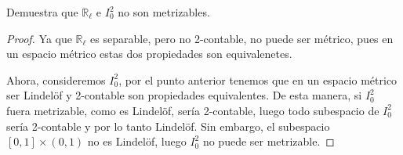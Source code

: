 
 \item Demuestra que $\mathbb{R}_{\ell}$ e $I^2_0$ no son metrizables.

\begin{proof}
    Ya que $\mathbb{R}_{\ell}$ es separable, pero no 2-contable, no puede ser métrico, pues en un espacio métrico estas dos propiedades son equivalenetes.

    Ahora, consideremos $I^2_0$, por el punto anterior tenemos que en un espacio métrico ser Lindelöf y 2-contable son propiedades equivalentes. De esta manera, si $I^2_0$ fuera metrizable, como es Lindelöf, sería 2-contable, luego todo subespacio de $I^2_0$ sería 2-contable y por lo tanto Lindelöf. Sin embargo, el subespacio $[0,1]\times (0,1)$ no es Lindelöf, luego $I^2_0$ no puede ser metrizable.
\end{proof}